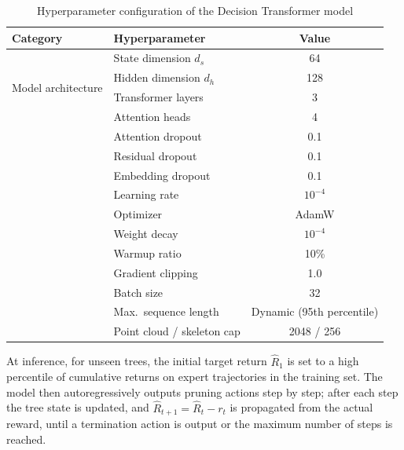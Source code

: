 \documentclass[12pt,a4paper,fontset=fandol]{ctexart}
\begin{document}
\begin{table}[H]
\centering
\begin{tabular}{llc}
\toprule
\textbf{Category} & \textbf{Hyperparameter} & \textbf{Value} \\
\midrule
\multirow{4}{*}{Model architecture}
  & State dimension $d_s$ & 64 \\
  & Hidden dimension $d_h$ & 128 \\
  & Transformer layers & 3 \\
  & Attention heads & 4 \\
\addlinespace
\multirow{3}{*}{Regularization}
  & Attention dropout & 0.1 \\
  & Residual dropout & 0.1 \\
  & Embedding dropout & 0.1 \\
\addlinespace
\multirow{5}{*}{Training}
  & Learning rate & $10^{-4}$ \\
  & Optimizer & AdamW \\
  & Weight decay & $10^{-4}$ \\
  & Warmup ratio & 10\% \\
  & Gradient clipping & 1.0 \\
\addlinespace
\multirow{3}{*}{Data}
  & Batch size & 32 \\
  & Max.\ sequence length & Dynamic (95th percentile) \\
  & Point cloud / skeleton cap & 2048 / 256 \\
\bottomrule
\end{tabular}
\caption{Hyperparameter configuration of the Decision Transformer model}
\label{tab:dt_config}
\end{table}

At inference, for unseen trees, the initial target return $\hat{R}_1$ is set to a high percentile of cumulative returns on expert trajectories in the training set.
The model then autoregressively outputs pruning actions step by step; after each step the tree state is updated,
and $\hat{R}_{t+1} = \hat{R}_t - r_t$ is propagated from the actual reward,
until a termination action is output or the maximum number of steps is reached.



\end{document}
